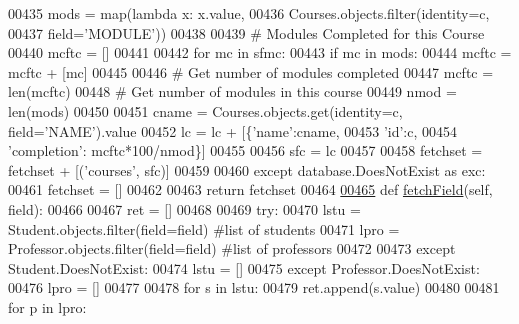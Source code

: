 \begin{DoxyCode}
00435                     mods = map(\textcolor{keyword}{lambda} x: x.value, 
00436                                Courses.objects.filter(identity=c,
00437                                                       field=\textcolor{stringliteral}{'MODULE'}))
00438                     
00439                     \textcolor{comment}{# Modules Completed for this Course}
00440                     mcftc = []
00441 
00442                     \textcolor{keywordflow}{for} mc \textcolor{keywordflow}{in} sfmc:
00443                         \textcolor{keywordflow}{if} mc \textcolor{keywordflow}{in} mods:
00444                             mcftc = mcftc + [mc]
00445 
00446                     \textcolor{comment}{# Get number of modules completed}
00447                     mcftc = len(mcftc)
00448                     \textcolor{comment}{# Get number of modules in this course}
00449                     nmod = len(mods)
00450 
00451                     cname = Courses.objects.get(identity=c, field=\textcolor{stringliteral}{'NAME'}).value
00452                     lc = lc + [\{\textcolor{stringliteral}{'name'}:cname, 
00453                                  \textcolor{stringliteral}{'id'}:c, 
00454                                  \textcolor{stringliteral}{'completion'}: mcftc*100/nmod\}]
00455 
00456                 sfc = lc
00457 
00458             fetchset = fetchset + [(\textcolor{stringliteral}{'courses'}, sfc)]
00459 
00460         \textcolor{keywordflow}{except} database.DoesNotExist \textcolor{keyword}{as} exc:
00461             fetchset = []
00462 
00463         \textcolor{keywordflow}{return} fetchset
00464 
\hypertarget{ProfileUnit_8py_source_l00465}{}\hyperlink{classProfile_1_1ProfileUnit_1_1PersProfile_abc02402fe65ceaabd7f3dea44d51999b}{00465}     \textcolor{keyword}{def }\hyperlink{classProfile_1_1ProfileUnit_1_1PersProfile_abc02402fe65ceaabd7f3dea44d51999b}{fetchField}(self, field):
00466 
00467         ret = []
00468 
00469         \textcolor{keywordflow}{try}:
00470             lstu = Student.objects.filter(field=field)   \textcolor{comment}{#list of students}
00471             lpro = Professor.objects.filter(field=field) \textcolor{comment}{#list of professors }
00472 
00473         \textcolor{keywordflow}{except} Student.DoesNotExist:
00474             lstu = []
00475         \textcolor{keywordflow}{except} Professor.DoesNotExist:
00476             lpro = []
00477 
00478         \textcolor{keywordflow}{for} s \textcolor{keywordflow}{in} lstu:
00479             ret.append(s.value)
00480 
00481         \textcolor{keywordflow}{for} p \textcolor{keywordflow}{in} lpro:

\end{DoxyCode}
